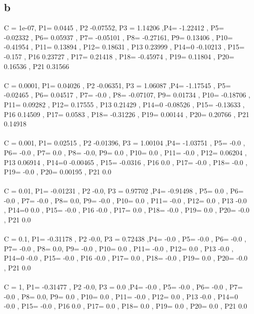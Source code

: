 \documentclass[11pt]{article} %
\begin{document}
\subsection{b}
C = 1e-07, P1= 0.0445 , P2 -0.07552, P3 = 1.14206 ,P4= -1.22412 , P5= -0.02332 , P6= 0.05937 , P7= -0.05101 , P8= -0.27161, P9= 0.13406 , P10= -0.41954 , P11= 0.13894 , P12= 0.18631 , P13 0.23999 , P14=0 -0.10213 , P15= -0.157 , P16 0.23727 , P17= 0.21418 , P18= -0.45974 , P19= 0.11804 , P20= 0.16536 , P21 0.31566 \\\\
 C = 0.0001, P1= 0.04026 , P2 -0.06351, P3 = 1.06087 ,P4= -1.17545 , P5= -0.02465 , P6= 0.04517 , P7= -0.0 , P8= -0.07107, P9= 0.01734 , P10= -0.18706 , P11= 0.09282 , P12= 0.17555 , P13 0.21429 , P14=0 -0.08526 , P15= -0.13633 , P16 0.14509 , P17= 0.0583 , P18= -0.31226 , P19= 0.00144 , P20= 0.20766 , P21 0.14918 \\\\
 C = 0.001, P1= 0.02515 , P2 -0.01396, P3 = 1.00104 ,P4= -1.03751 , P5= -0.0 , P6= -0.0 , P7= 0.0 , P8= -0.0, P9= 0.0 , P10= 0.0 , P11= -0.0 , P12= 0.06204 , P13 0.06914 , P14=0 -0.00465 , P15= -0.0316 , P16 0.0 , P17= -0.0 , P18= -0.0 , P19= -0.0 , P20= 0.00195 , P21 0.0 \\\\
 C = 0.01, P1= -0.01231 , P2 -0.0, P3 = 0.97702 ,P4= -0.91498 , P5= 0.0 , P6= -0.0 , P7= -0.0 , P8= 0.0, P9= -0.0 , P10= 0.0 , P11= -0.0 , P12= 0.0 , P13 -0.0 , P14=0 0.0 , P15= -0.0 , P16 -0.0 , P17= 0.0 , P18= -0.0 , P19= 0.0 , P20= -0.0 , P21 0.0 \\\\
 C = 0.1, P1= -0.31178 , P2 -0.0, P3 = 0.72438 ,P4= -0.0 , P5= -0.0 , P6= -0.0 , P7= -0.0 , P8= 0.0, P9= -0.0 , P10= 0.0 , P11= -0.0 , P12= 0.0 , P13 -0.0 , P14=0 -0.0 , P15= -0.0 , P16 -0.0 , P17= 0.0 , P18= -0.0 , P19= 0.0 , P20= -0.0 , P21 0.0 \\\\
 C = 1, P1= -0.31477 , P2 -0.0, P3 = 0.0 ,P4= -0.0 , P5= -0.0 , P6= -0.0 , P7= -0.0 , P8= 0.0, P9= 0.0 , P10= 0.0 , P11= -0.0 , P12= 0.0 , P13 -0.0 , P14=0 -0.0 , P15= -0.0 , P16 0.0 , P17= 0.0 , P18= 0.0 , P19= 0.0 , P20= 0.0 , P21 0.0 \\\\
\end{document}
